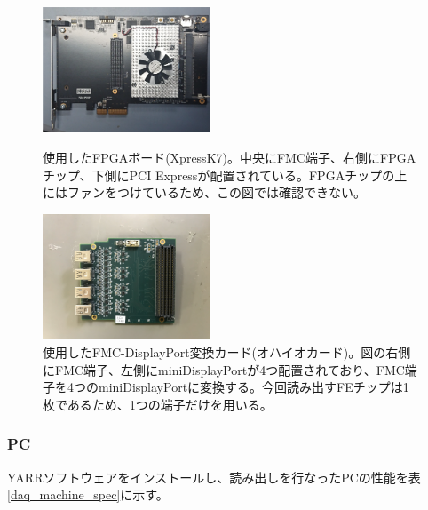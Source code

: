 \begin{figure}[htbp]
 \begin{minipage}{0.5\hsize}
  \begin{center}
   \includegraphics[width=50mm]{./fpga_board.png}
  \end{center}
  \caption[使用したFPGAボード(XpressK7)]{使用したFPGAボード(XpressK7\cite{5-2})。中央にFMC端子、右側にFPGAチップ、下側にPCI Expressが配置されている。FPGAチップの上にはファンをつけているため、この図では確認できない。}
  \label{demo_fpga_board}
 \end{minipage}
 \begin{minipage}{0.5\hsize}
  \begin{center}
   \includegraphics[width=50mm]{./ohio.png}
  \end{center}
  \caption[使用したFMC-DisplayPort変換カード(オハイオカード)]{使用したFMC-DisplayPort変換カード(オハイオカード)。図の右側にFMC端子、左側にminiDisplayPortが4つ配置されており、FMC端子を4つのminiDisplayPortに変換する。今回読み出すFEチップは1枚であるため、1つの端子だけを用いる。}
  \label{demo_ohio}
 \end{minipage}
\end{figure}

\subsubsection{PC}
YARRソフトウェアをインストールし、読み出しを行なったPCの性能を表\ref{daq_machine_spec}に示す。
\begin{table}[tbp]
\begin{center}
\caption[読み出しに使用したPCの性能]{読み出しに使用したPCの性能。研究室で所有するPCを使用した。OSはcentOS7である。}
\label{daq_machine_spec}
\end{center}
\end{table}

